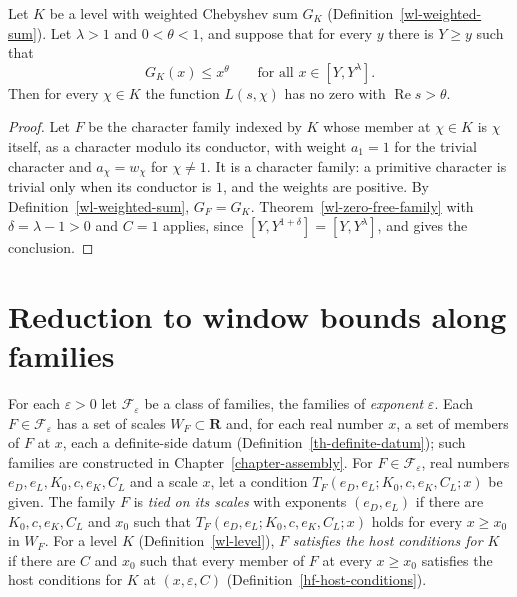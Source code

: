 \begin{theorem}\label{wl-zero-free-level}
Let $K$ be a level with weighted Chebyshev sum $G_K$
(Definition~\ref{wl-weighted-sum}). Let $\lambda>1$ and $0<\theta<1$, and
suppose that for every $y$ there is $Y\geq y$ such that
\[
 G_K(x)\leq x^\theta\qquad\text{for all }x\in[Y,Y^\lambda].
\]
Then for every $\chi\in K$ the function $L(s,\chi)$ has no zero with
$\operatorname{Re}s>\theta$.
\end{theorem}
\begin{proof}
Let $F$ be the character family indexed by $K$ whose member at $\chi\in K$
is $\chi$ itself, as a character modulo its conductor, with weight $a_1=1$
for the trivial character and $a_\chi=w_\chi$ for $\chi\neq1$. It is a
character family: a primitive character is trivial only when its conductor
is $1$, and the weights are positive. By Definition~\ref{wl-weighted-sum},
$G_F=G_K$. Theorem~\ref{wl-zero-free-family} with $\delta=\lambda-1>0$ and
$C=1$ applies, since $[Y,Y^{1+\delta}]=[Y,Y^\lambda]$, and gives the
conclusion.
\end{proof}

\section{Reduction to window bounds along families}\label{section-wl-reduction}

\begin{situation}\label{wl-families}
For each $\varepsilon>0$ let $\mathcal F_\varepsilon$ be a class of families,
the families of \emph{exponent} $\varepsilon$.
Each $F\in\mathcal F_\varepsilon$ has a set of scales $W_F\subset\mathbf R$
and, for each real number $x$, a set of members of $F$ at $x$, each a
definite-side datum (Definition~\ref{th-definite-datum}); such families are
constructed in Chapter~\ref{chapter-assembly}. For $F\in\mathcal F_\varepsilon$, real
numbers $e_D,e_L,K_0,c,e_K,C_L$ and a scale $x$, let a condition
$T_F(e_D,e_L;K_0,c,e_K,C_L;x)$ be given. The family $F$ is \emph{tied on its
scales} with exponents $(e_D,e_L)$ if there are $K_0,c,e_K,C_L$ and $x_0$
such that $T_F(e_D,e_L;K_0,c,e_K,C_L;x)$ holds for every $x\geq x_0$ in
$W_F$. For a level $K$ (Definition~\ref{wl-level}), $F$ \emph{satisfies the
host conditions for $K$} if there are $C$ and $x_0$ such that every member of
$F$ at every $x\geq x_0$ satisfies the host conditions for $K$ at
$(x,\varepsilon,C)$ (Definition~\ref{hf-host-conditions}).
\end{situation}

